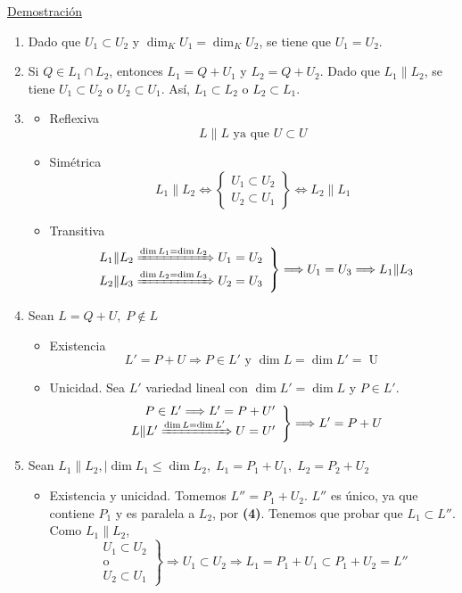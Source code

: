 \documentclass[12pt, a4paper, ones, notitlepage, openany,titlepage]{article}
\newcommand{\demostracion}{\noindent\underline{Demostración}}
\begin{document}
\demostracion
\begin{enumerate}[label=(\arabic*)]
\item Dado que $U_{1} \subset U_{2}$ y $\dim _{K} U_{1}=\dim _{K} U_{2}$, se tiene que $U_{1}=U_{2}$.

\item Si $Q \in L_{1} \cap L_{2}$, entonces $L_{1}=Q+U_{1}$ y $L_{2}=Q+U_{2}$. Dado que $L_{1} \| L_{2}$, se tiene $U_{1} \subset U_{2}$ o $U_{2} \subset U_{1}$. Así, $L_{1} \subset L_{2}$ o $L_{2} \subset L_{1}$.

\item \begin{itemize}
	\item Reflexiva
	$$
	L \| L \text{ ya que } U \subset U
	$$
	\item Simétrica
	$$
	L_1 \| L_2 \Longleftrightarrow \left\{\begin{array}{r}
		U_1 \subset U_2 \\
		U_2 \subset U_1
	\end{array}\right\} \Longleftrightarrow L_2 \| L_1
	$$
	\item Transitiva
	$$
	\left.\begin{array}{r}
		L_1 \| L_2 \xRightarrow{\dim L_1 = \dim L_2} U_1 = U_2 \\
		L_2 \| L_3 \xRightarrow{\dim L_2 = \dim L_3} U_2 = U_3
	\end{array}\right\} \Longrightarrow U_1 = U_3 \Longrightarrow L_1 \| L_3
	$$
\end{itemize}

\item Sean $L = Q + U, \; P \notin L$
\begin{itemize}
	\item Existencia
	$$
	L' = P + U \Longrightarrow P \in L' \text{ y } \dim L = \dim L' = \operatorname{U}
	$$
	\item Unicidad. Sea $L'$ variedad lineal con $\dim L' = \dim L$ y $P \in L'$.
	$$
	\left.\begin{array}{r}
		P \in L' \Longrightarrow L' = P + U' \\
		L \| L' \xRightarrow{\dim L = \dim L'} U = U'
	\end{array}\right\} \Longrightarrow L' = P + U
	$$
\end{itemize}

\item Sean $L_1 \| L_2, \mid \dim L_1 \le \dim  L_2, \; L_1 = P_1 + U_1, \; L_2 = P_2 + U_2$
\begin{itemize}
	\item Existencia y unicidad. Tomemos $L'' = P_1 + U_2$. $L''$ es único, ya que contiene $P_1$ y es paralela a $L_2$, por \textbf{(4)}. Tenemos que probar que $L_1 \subset L''$. Como $L_1 \| L_2$,
	$$
	\left.\begin{array}{r}
		U_1 \subset U_2  \\
		\text{o} \\
		U_2 \subset U_1
	\end{array}\right\} \Longrightarrow U_1 \subset U_2 \Longrightarrow L_1 = P_1 + U_1 \subset P_1 + U_2 = L''
	$$
\end{itemize}
\end{enumerate}
\end{document}
